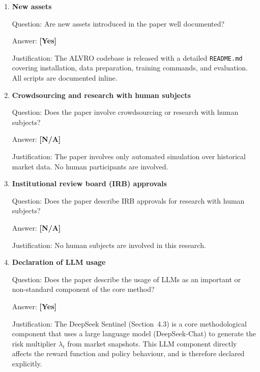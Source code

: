 \documentclass{article}
\begin{document}
\begin{enumerate}
Question: Are creators of assets used in the paper properly credited with license information?

Answer: \textbf{[Yes]}

Justification: The WETH/USDC dataset is sourced from \citet{xu2025} (publicly available, MIT license). Stable-Baselines3 \citep{raffin2021sb3} and sb3-contrib are MIT-licensed. The GARCH implementation uses the \texttt{arch} package (BSD license). All are cited in the paper and references.

\item \textbf{New assets}

Question: Are new assets introduced in the paper well documented?

Answer: \textbf{[Yes]}

Justification: The ALVRO codebase is released with a detailed \texttt{README.md} covering installation, data preparation, training commands, and evaluation. All scripts are documented inline.

\item \textbf{Crowdsourcing and research with human subjects}

Question: Does the paper involve crowdsourcing or research with human subjects?

Answer: \textbf{[N/A]}

Justification: The paper involves only automated simulation over historical market data. No human participants are involved.

\item \textbf{Institutional review board (IRB) approvals}

Question: Does the paper describe IRB approvals for research with human subjects?

Answer: \textbf{[N/A]}

Justification: No human subjects are involved in this research.

\item \textbf{Declaration of LLM usage}

Question: Does the paper describe the usage of LLMs as an important or non-standard component of the core method?

Answer: \textbf{[Yes]}

Justification: The DeepSeek Sentinel (Section~4.3) is a core methodological component that uses a large language model (DeepSeek-Chat) to generate the risk multiplier $\lambda_t$ from market snapshots. This LLM component directly affects the reward function and policy behaviour, and is therefore declared explicitly.

\end{enumerate}
\end{document}

